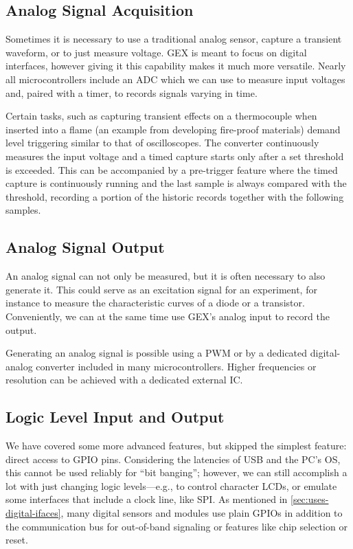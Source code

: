 \subsection{Analog Signal Acquisition}

Sometimes it is necessary to use a traditional analog sensor, capture a transient waveform, or to just measure voltage. GEX is meant to focus on digital interfaces, however giving it this capability makes it much more versatile. Nearly all microcontrollers include an \gls{ADC} which we can use to measure input voltages and, paired with a timer, to records signals varying in time.

Certain tasks, such as capturing transient effects on a thermocouple when inserted into a flame (an example from developing fire-proof materials) demand level triggering similar to that of oscilloscopes. The converter continuously measures the input voltage and a timed capture starts only after a set threshold is exceeded. This can be accompanied by a pre-trigger feature where the timed capture is continuously running and the last sample is always compared with the threshold, recording a portion of the historic records together with the following samples.

\subsection{Analog Signal Output}

An analog signal can not only be measured, but it is often necessary to also generate it. This could serve as an excitation signal for an experiment, for instance to measure the characteristic curves of a diode or a transistor. Conveniently, we can at the same time use GEX's analog input to record the output.

Generating an analog signal is possible using a \gls{PWM} or by a dedicated digital-analog converter included in many microcontrollers. Higher frequencies or resolution can be achieved with a dedicated external \gls{IC}.

\subsection{Logic Level Input and Output}

We have covered some more advanced features, but skipped the simplest feature: direct access to \gls{GPIO} pins. Considering the latencies of \gls{USB} and the \gls{PC}'s \gls{OS}, this cannot be used reliably for ``bit banging''; however, we can still accomplish a lot with just changing logic levels---e.g., to control character \glspl{LCD}, or emulate some interfaces that include a clock line, like \gls{SPI}. As mentioned in \cref{sec:uses-digital-ifaces}, many digital sensors and modules use plain \glspl{GPIO} in addition to the communication bus for out-of-band signaling or features like chip selection or reset.

